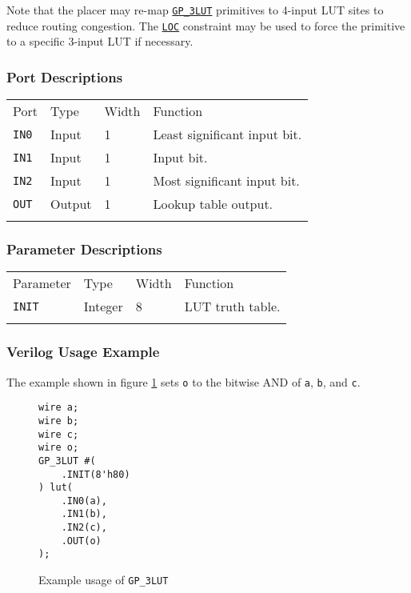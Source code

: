 \documentclass[11pt]{article}
\newcommand{\tokenstyle}[1]{\texttt{#1}}
\newcommand{\wirestyle}[1]{\texttt{#1}}
\newcommand{\whenstyle}[1]{{\fontseries{sb}\selectfont#1}}
\newcommand{\tokenref}[2]{\hyperref[#2]{\tokenstyle{#1}}}
\newcommand{\thinhline}{\Xhline{1\arrayrulewidth}}
\newcommand{\thickhline}{\Xhline{2.5\arrayrulewidth}}
\begin{document}
Note that the placer may re-map \tokenref{GP\_3LUT}{gp-3lut} primitives to 4-input LUT sites to reduce routing 
congestion. The \tokenref{LOC}{LOC} constraint may be used to force the primitive to a specific 3-input LUT if 
necessary.

\subsubsection{Port Descriptions}

\begin{tabularx}{\textwidth}{lllX}
\thinhline
\whenstyle{Port} & \whenstyle{Type} & \whenstyle{Width} & \whenstyle{Function} \\
\thickhline
\tokenstyle{IN0} & Input & 1 & Least significant input bit. \\
\thinhline
\tokenstyle{IN1} & Input & 1 & Input bit. \\
\thinhline
\tokenstyle{IN2} & Input & 1 & Most significant input bit. \\
\thinhline
\tokenstyle{OUT} & Output & 1 & Lookup table output. \\
\thinhline
\end{tabularx}

\subsubsection{Parameter Descriptions}

\begin{tabularx}{\textwidth}{lllX}
\thinhline
\whenstyle{Parameter} & \whenstyle{Type} & \whenstyle{Width} & \whenstyle{Function} \\
\thickhline
\tokenstyle{INIT} & Integer & 8 & LUT truth table. \\
\thinhline
\end{tabularx}

\subsubsection{Verilog Usage Example}

The example shown in figure \ref{gp-3LUT-example} sets \wirestyle{o} to the bitwise AND of \wirestyle{a}, \wirestyle{b}, and \wirestyle{c}.

\begin{figure}[h]
\begin{lstlisting}
wire a;
wire b;
wire c;
wire o;
GP_3LUT #(
	.INIT(8'h80)
) lut(
	.IN0(a),
	.IN1(b),
	.IN2(c),
	.OUT(o)
);
\end{lstlisting}
\caption{Example usage of \tokenstyle{GP\_3LUT}}
\label{gp-3LUT-example}
\end{figure}
\end{document}
